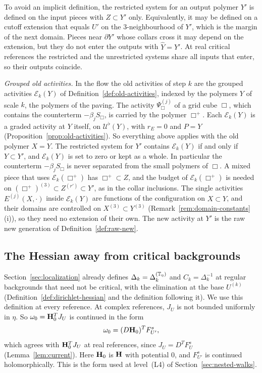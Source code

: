 \begin{remark}
To avoid an implicit definition, the restricted system for an output polymer $Y'$ is defined on the input pieces with $Z\subset Y'$ only. Equivalently, it may be defined on a cutoff extension that equals $U'$ on the $3$-neighbourhood of $Y'$, which is the margin of the next domain. Pieces near $\partial Y'$ whose collars cross it may depend on the extension, but they do not enter the outputs with $\hat Y=Y'$. At real critical references the restricted and the unrestricted systems share all inputs that enter, so their outputs coincide.

\emph{Grouped old activities.} In the flow the old activities of step $k$ are the grouped activities $\mathcal E_k(Y)$ of Definition~\ref{def:old-activities}, indexed by the polymers $Y$ of scale $k$, the polymers of the paving. The activity $\Psi^{(j)}_\Box$ of a grid cube $\Box$, which contains the counterterm $-\beta_jS_\Box$, is carried by the polymer $\Box^+$. Each $\mathcal E_k(Y)$ is a graded activity at $Y$ itself, on $\mathcal U^\flat(Y)$, with $r_E=0$ and $P=Y$ (Proposition~\ref{prop:old-activities}). So everything above applies with the old polymer $X=Y$. The restricted system for $Y'$ contains $\mathcal E_k(Y)$ if and only if $Y\subset Y'$, and $\mathcal E_k(Y)$ is set to zero or kept as a whole. In particular the counterterm $-\beta_jS_\Box$ is never separated from the small polymers of $\Box$. A mixed piece that uses $\mathcal E_k(\Box^+)$ has $\Box^+\subset Z$, and the budget of $\mathcal E_k(\Box^+)$ is needed on $(\Box^+)^{(3)}\subset Z^{(r')}\subset Y'$, as in the collar inclusions. The single activities $E^{(j)}(X,\cdot)$ inside $\mathcal E_k(Y)$ are functions of the configuration on $X\subset Y$, and their domains are controlled on $X^{(3)}\subset Y^{(3)}$ (Remark~\ref{rem:domain-constants}(i)), so they need no extension of their own. The new activity at $Y'$ is the raw new generation of Definition~\ref{def:raw-new}.
\end{remark}

\subsection{The Hessian away from critical backgrounds}\label{subsec:sq-hessian}

Section~\ref{sec:localization} already defines $\Delta_k=\Delta_k^{(\mathbb T_\eta)}$ and $C_k=\Delta_k^{-1}$ at regular backgrounds that need not be critical, with the elimination at the base $U^{(k)}$ (Definition~\ref{def:dirichlet-hessian} and the definition following it). We use this definition at every reference. At complex references, $J_U$ is not bounded uniformly in $\eta$. So $\omega_0=\mathbf H_0^TJ_U$ is continued in the form
\[
\omega_0=(D\mathbf H_0)^TF^s_{U'},
\]
which agrees with $\mathbf H_0^TJ_U$ at real references, since $J_U=D^TF^s_U$ (Lemma~\ref{lem:current}). Here $\mathbf H_0$ is $\mathbf H$ with potential $0$, and $F^s_{U'}$ is continued holomorphically. This is the form used at level~(L4) of Section~\ref{sec:nested-walks}.

